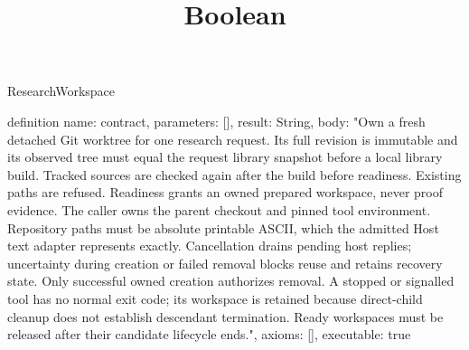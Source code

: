 \begin{lexlean}{ResearchWorkspace}
\title{Boolean}
\begin{semanticmodule}

definition{
 name: contract,
 parameters: [],
 result: String,
 body: "Own a fresh detached Git worktree for one research request. Its full revision is immutable and its observed tree must equal the request library snapshot before a local library build. Tracked sources are checked again after the build before readiness. Existing paths are refused. Readiness grants an owned prepared workspace, never proof evidence. The caller owns the parent checkout and pinned tool environment. Repository paths must be absolute printable ASCII, which the admitted Host text adapter represents exactly. Cancellation drains pending host replies; uncertainty during creation or failed removal blocks reuse and retains recovery state. Only successful owned creation authorizes removal. A stopped or signalled tool has no normal exit code; its workspace is retained because direct-child cleanup does not establish descendant termination. Ready workspaces must be released after their candidate lifecycle ends.",
 axioms: [],
 executable: true
}


\end{semanticmodule}
\end{lexlean}
